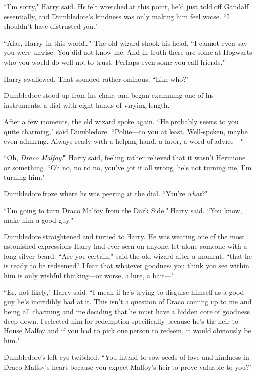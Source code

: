 ``I'm sorry," Harry said. He felt wretched at this point, he'd just told off Gandalf essentially, and Dumbledore's kindness was only making him feel worse. ``I shouldn't have distrusted you."

``Alas, Harry, in this world{\ldots}" The old wizard shook his head. ``I cannot even say you were unwise. You did not know me. And in truth there are some at Hogwarts who you would do well not to trust. Perhaps even some you call friends."

Harry swallowed. That sounded rather ominous. ``Like who?"

Dumbledore stood up from his chair, and began examining one of his instruments, a dial with eight hands of varying length.

After a few moments, the old wizard spoke again. ``He probably seems to you quite charming," said Dumbledore. ``Polite—to you at least. Well-spoken, maybe even admiring. Always ready with a helping hand, a favor, a word of advice—"

``Oh, \emph{Draco Malfoy!}" Harry said, feeling rather relieved that it wasn't Hermione or something. ``Oh no, no no no, you've got it all wrong, he's not turning me, I'm turning him."

Dumbledore froze where he was peering at the dial. ``You're \emph{what}?"

``I'm going to turn Draco Malfoy from the Dark Side," Harry said. ``You know, make him a good guy."

Dumbledore straightened and turned to Harry. He was wearing one of the most astonished expressions Harry had ever seen on anyone, let alone someone with a long silver beard. ``Are you certain," said the old wizard after a moment, ``that he is ready to be redeemed? I fear that whatever goodness you think you see within him is only wishful thinking—or worse, a lure, a bait—"

``Er, not likely," Harry said. ``I mean if he's trying to disguise himself as a good guy he's incredibly bad at it. This isn't a question of Draco coming up to me and being all charming and me deciding that he must have a hidden core of goodness deep down. I selected him for redemption specifically because he's the heir to House Malfoy and if you had to pick one person to redeem, it would obviously be him."

Dumbledore's left eye twitched. ``You intend to sow seeds of love and kindness in Draco Malfoy's heart because you expect Malfoy's heir to prove valuable to you?"

